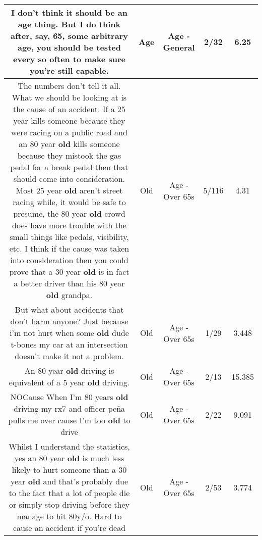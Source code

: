 \documentclass[11pt]{article}
\newlength\mylength
\begin{document}
\begin{center}
\begin{longtable}{|C{.65\mylength}|C{.30\mylength}|C{.12\mylength}|C{.12\mylength}|C{.12\mylength}|}
  \small I don't think it should be an \textbf{age} thing. But I do think after, say, 65, some arbitrary \textbf{age}, you should be tested every so often to make sure you're still capable.\normalsize   & Age & Age - General & 2/32 & 6.25 \\  \hline
  \small The numbers don't tell it all. What we should be looking at is the cause of an accident. If a 25 year kills someone because they were racing on a public road and an 80 year \textbf{old} kills someone because they mistook the gas pedal for a break pedal then that should come into consideration. Most 25 year \textbf{old} aren't street racing while, it would be safe to presume, the 80 year \textbf{old} crowd does have more trouble with the small things like pedals, visibility, etc. I think if the cause was taken into consideration then you could prove that a 30 year \textbf{old} is in fact a better driver than his 80 year \textbf{old} grandpa.\normalsize   & Old & Age - Over 65s & 5/116 & 4.31 \\  \hline
  \small But what about accidents that don't harm anyone? Just because i'm not hurt when some \textbf{old} dude t-bones my car at an intersection doesn't make it not a problem.\normalsize   & Old & Age - Over 65s & 1/29 & 3.448 \\  \hline
  \small An 80 year \textbf{old} driving is equivalent of a 5 year \textbf{old} driving.\normalsize   & Old & Age - Over 65s & 2/13 & 15.385 \\  \hline
  \small NOCause When I'm 80 years \textbf{old} driving my rx7 and officer peña pulls me over cause I'm too \textbf{old} to drive\normalsize   & Old & Age - Over 65s & 2/22 & 9.091 \\  \hline
  \small Whilst I understand the statistics, yes an 80 year \textbf{old} is much less likely to hurt someone than a 30 year \textbf{old} and that's probably due to the fact that a lot of people die or simply stop driving before they manage to hit 80y/o. Hard to cause an accident if you're dead\normalsize   & Old & Age - Over 65s & 2/53 & 3.774 \\  \hline

\end{longtable}
\end{center}
\end{document}
